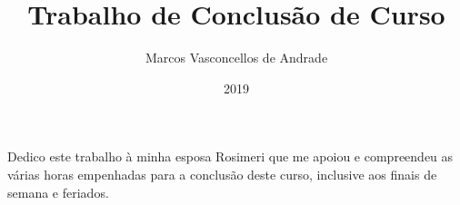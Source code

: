 \documentclass[tsi]{ifbclass/ifbclass}
\title{Trabalho de Conclusão de Curso}
\date{2019}
\author{Marcos Vasconcellos de Andrade}
\begin{document}
\frontmatter

\frontpage

\presentationpage

\begin{fichacatalografica}
  \FakeFichaCatalografica
\end{fichacatalografica}

\banca

\begin{dedicatory} %
Dedico este trabalho à minha esposa Rosimeri que me apoiou e compreendeu as
várias horas empenhadas para a conclusão deste curso, inclusive aos finais
de semana e feriados.
\end{dedicatory}
  
\acknowledgements %


%

\resumo
{\parindent0pt
  
}
  
\abstract
{\parindent0pt
  
}

\listoffigures

\lstlistoflistings

\listoftables

\listofacronyms


\tableofcontents

\mainmatter








\begin{references}
  
\end{references}


\theappendix

\end{document}
